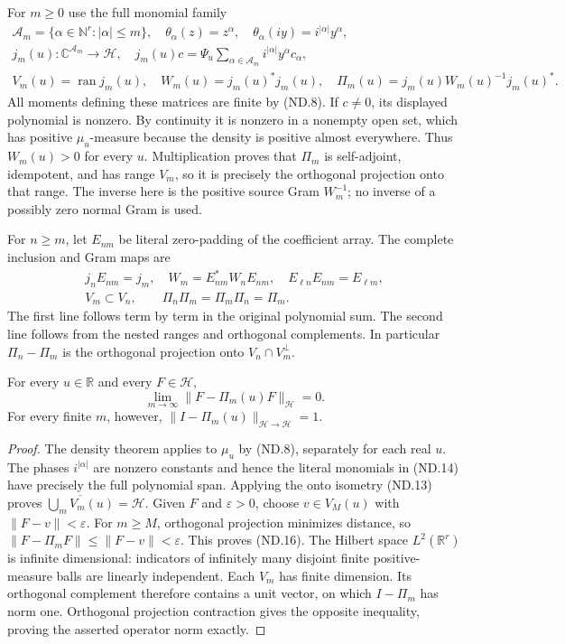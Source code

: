 For \(m\ge0\) use the full monomial family
\[
 \begin{gathered}
 \mathcal A_m=\{\alpha\in\mathbb N^r:|\alpha|\le m\},\quad
 \theta_\alpha(z)=z^\alpha,\quad
 \theta_\alpha(iy)=i^{|\alpha|}y^\alpha,\\
 j_m(u):\mathbb C^{\mathcal A_m}\to\mathscr H,\quad
 j_m(u)c=\Psi_u\sum_{\alpha\in\mathcal A_m}
                         i^{|\alpha|}y^\alpha c_\alpha,\\
 V_m(u)=\operatorname{ran}j_m(u),\quad W_m(u)=j_m(u)^*j_m(u),
 \quad \Pi_m(u)=j_m(u)W_m(u)^{-1}j_m(u)^*.
 \end{gathered}
 \tag{ND.14}
\]
All moments defining these matrices are finite by (ND.8). If \(c\ne0\),
its displayed polynomial is nonzero. By continuity it is nonzero in a
nonempty open set, which has positive \(\mu_u\)-measure because
the density is positive almost everywhere. Thus \(W_m(u)>0\)
for every \(u\). Multiplication proves that \(\Pi_m\) is
self-adjoint, idempotent, and has range \(V_m\), so it is precisely
the orthogonal projection onto that range. The inverse here is the
positive source Gram \(W_m^{-1}\); no inverse of a possibly zero
normal Gram is used.

For \(n\ge m\), let \(E_{nm}\) be literal zero-padding of the
coefficient array. The complete inclusion and Gram maps are
\[
 \begin{gathered}
 j_n E_{nm}=j_m,\quad W_m=E_{nm}^*W_n E_{nm},\quad
 E_{\ell n}E_{nm}=E_{\ell m},\\
 V_m\subset V_n,\qquad
 \Pi_n\Pi_m=\Pi_m\Pi_n=\Pi_m.
 \end{gathered}
 \tag{ND.15}
\]
The first line follows term by term in the original polynomial sum.
The second line follows from the nested ranges and orthogonal
complements. In particular \(\Pi_n-\Pi_m\) is the orthogonal
projection onto \(V_n\cap V_m^\perp\).

\begin{theorem}
For every \(u\in\mathbb R\) and every \(F\in\mathscr H\),
\[
 \lim_{m\to\infty}\|F-\Pi_m(u)F\|_{\mathscr H}=0.
 \tag{ND.16}
\]
For every finite \(m\), however,
\(\|I-\Pi_m(u)\|_{\mathscr H\to\mathscr H}=1\).
\end{theorem}

\begin{proof}
The density theorem applies to \(\mu_u\) by (ND.8), separately
for each real \(u\). The phases \(i^{|\alpha|}\) are nonzero
constants and hence the literal monomials in (ND.14) have precisely
the full polynomial span. Applying the onto isometry (ND.13) proves
\(\overline{\bigcup_m V_m(u)}=\mathscr H\). Given \(F\) and
\(\varepsilon>0\), choose \(v\in V_M(u)\) with
\(\|F-v\|<\varepsilon\). For \(m\ge M\), orthogonal
projection minimizes distance, so
\(\|F-\Pi_mF\|\le\|F-v\|<\varepsilon\).
This proves (ND.16).
The Hilbert space \(L^2(\mathbb R^r)\) is infinite dimensional:
indicators of infinitely many disjoint finite positive-measure balls
are linearly independent. Each \(V_m\) has finite dimension.
Its orthogonal complement therefore contains a unit vector, on which
\(I-\Pi_m\) has norm one. Orthogonal projection contraction gives
the opposite inequality, proving the asserted operator norm exactly.
\end{proof}

